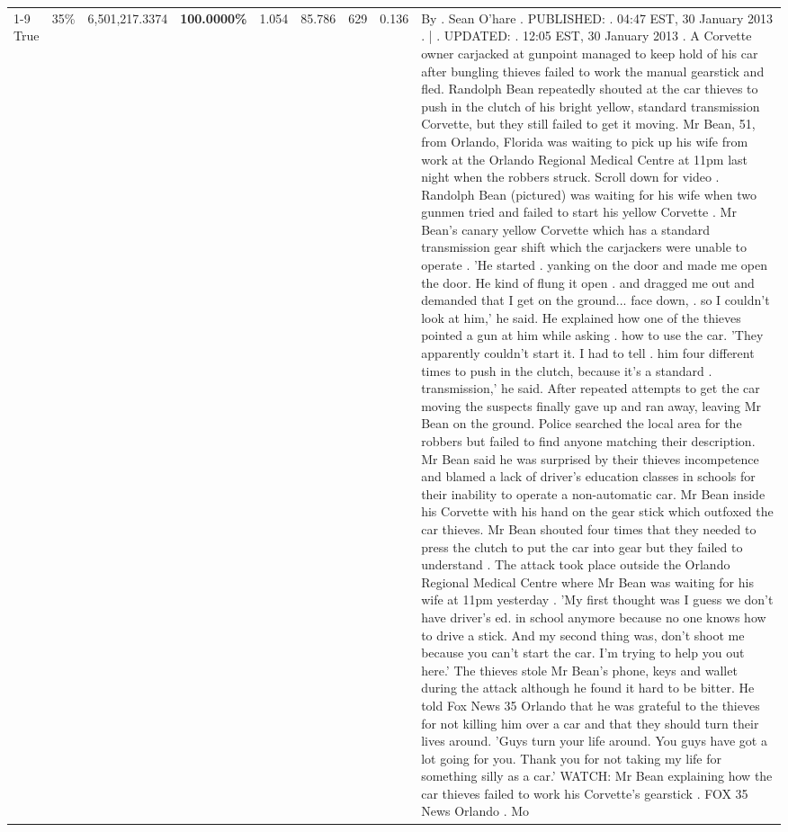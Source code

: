 \begin{table}[H]
\begin{tabular}{lllrlllll}
\cline{1-9} \cline{2-9}
True & 35\% & 6,501,217.3374 & \bfseries \color{red} 100.0000\% & 1.054 & 85.786 & 629 & 0.136 & By . Sean O'hare . PUBLISHED: . 04:47 EST, 30 January 2013 . | . UPDATED: . 12:05 EST, 30 January 2013 . A Corvette owner carjacked at gunpoint managed to keep hold of his car after bungling thieves failed to work the manual gearstick and fled. Randolph Bean repeatedly shouted at the car thieves to push in the clutch of his bright yellow, standard transmission Corvette, but they still failed to get it moving. Mr Bean, 51, from Orlando, Florida was waiting to pick up his wife from work at the Orlando Regional Medical Centre at 11pm last night when the robbers struck. Scroll down for video . Randolph Bean (pictured) was waiting for his wife when two gunmen tried and failed to start his yellow Corvette . Mr Bean's canary yellow Corvette which has a standard transmission gear shift which the carjackers were unable to operate . 'He started . yanking on the door and made me open the door. He kind of flung it open . and dragged me out and demanded that I get on the ground... face down, . so I couldn't look at him,' he said. He explained how one of the thieves pointed a gun at him while asking . how to use the car. 'They apparently couldn't start it. I had to tell . him four different times to push in the clutch, because it's a standard . transmission,' he said. After repeated attempts to get the car moving the suspects finally gave up and ran away, leaving Mr Bean on the ground. Police searched the local area for the robbers but failed to find anyone matching their description. Mr Bean said he was surprised by their thieves incompetence and blamed a lack of driver's education classes in schools for their inability to operate a non-automatic car. Mr Bean inside his Corvette with his hand on the gear stick which outfoxed the car thieves. Mr Bean shouted four times that they needed to press the clutch to put the car into gear but they failed to understand . The attack took place outside the Orlando Regional Medical Centre where Mr Bean was waiting for his wife at 11pm yesterday . 'My first thought was I guess we don't have driver's ed. in school anymore because no one knows how to drive a stick. And my second thing was, don't shoot me because you can't start the car. I'm trying to help you out here.' The thieves stole Mr Bean's phone, keys and wallet during the attack although he found it hard to be bitter. He told Fox News 35 Orlando that he was grateful to the thieves for not killing him over a car and that they should turn their lives around. 'Guys turn your life around. You guys have got a lot going for you. Thank you for not taking my life for something silly as a car.' WATCH: Mr Bean explaining how the car thieves failed to work his Corvette's gearstick . FOX 35 News Orlando . Mo \\

\end{tabular}
\end{table}
